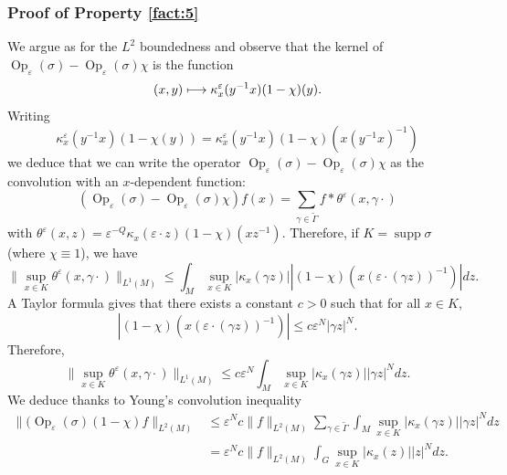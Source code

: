 \documentclass[JEP,XML,SOM,Unicode,published]{cedram}
\newcommand\mto{\mathchoice{\longmapsto}{\mapsto}{\mapsto}{\mapsto}}
\DeclareMathOperator{\Op}{Op}
\DeclareMathOperator{\supp}{supp}
\theoremstyle{plain}
\theoremstyle{definition}
\let\eps\varepsilon
\begin{document}
\subsubsection*{Proof of Property \eqref{fact:5}}
We argue as for the $L^2$ boundedness and observe that the kernel of $\Op_\eps(\sigma) - \Op_\eps(\sigma) \chi$
is the function
\[
(x,y)\mto \kappa^\eps_x(y^{-1} x)(1-\chi)(y).
\]
Writing
\[
\kappa^\eps_x(y^{-1} x)(1-\chi(y))= \kappa^\eps_x(y^{-1} x)(1-\chi)(x(y^{-1} x)^{-1})
\]
we deduce that we can write the operator $\Op_\eps(\sigma) - \Op_\eps(\sigma) \chi$ as the convolution with an $x$-dependent function:
\[
(\Op_\eps(\sigma) - \Op_\eps(\sigma) \chi)f(x)= \sum_{\gamma\in \widetilde{\Gamma}}f* \theta^\eps (x,\gamma \cdot)
\]
with
$\theta^\eps(x,z)= \eps^{-Q} \kappa_x (\eps\cdot z)(1- \chi)(xz^{-1}).$
Therefore, if $K=\supp \sigma$ (where $\chi\equiv 1$), we have
\[
\| \sup_{x\in K} \theta^\eps(x,\gamma \cdot) \|_{L^1(M)}\leq \int_M\sup_{x\in K} | \kappa_x(\gamma z) |
|(1-\chi)(x(\eps\cdot (\gamma z))^{-1})| dz.
\]
A Taylor formula gives that there exists a constant $c>0$ such that for all $x\in K$,
\[
|(1-\chi)(x(\eps\cdot (\gamma z))^{-1})| \leq c\eps^N |\gamma z|^N.
\]
Therefore,
\[
\| \sup_{x\in K} \theta^\eps(x,\gamma \cdot) \|_{L^1(M)}\leq c \eps^N \int_M\sup_{x\in K} | \kappa_x(\gamma z) | |\gamma z|^N dz.
\]
We deduce thanks to Young's convolution inequality
\begin{align*}
\| (\Op_\eps(\sigma)(1- \chi)f\| _{L^2(M)}
&\leq \eps^N c \| f\|_{L^2(M)} \sum_{\gamma\in \widetilde{\Gamma}} \int_M\sup_{x\in K} | \kappa_x(\gamma z) | |\gamma z|^N dz\\
&= \eps^N c \| f\|_{L^2(M)} \int_G\sup_{x\in K} | \kappa_x(z) | |z|^N dz.
\end{align*}

\end{document}
